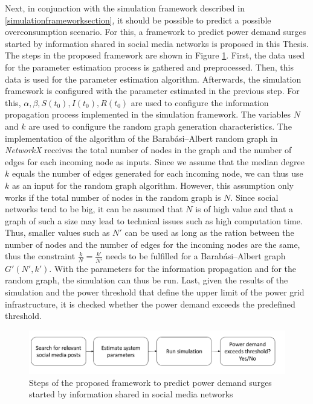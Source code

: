 Next, in conjunction with the simulation framework described in 
\ref{simulationframeworksection}, it should be possible to predict 
a possible overconsumption scenario. For this, a framework
to predict power demand surges started by information shared in 
social media networks is proposed in this Thesis. The steps
in the proposed framework are shown in Figure \ref{basicpredicitonframework}.
First, the data used for the parameter estimation process is gathered and
preprocessed. Then, this data is used for the parameter estimation algorithm. 
Afterwards, the simulation framework is configured
with the parameter estimated in the previous step. For this, 
$\alpha, \beta, S(t_0), I(t_0), R(t_0)$ are used to configure the 
information propagation process implemented in the simulation framework.
The variables $N$ and $k$ are used to configure the random graph generation
characteristics. The implementation of the 
algorithm of the Barabási–Albert random graph in \textit{NetworkX}
receives the total number of nodes in the graph and the number of edges 
for each incoming node as inputs. Since we assume that the median degree
$k$ equals the number of edges generated for each incoming node, we can thus
use $k$ as an input for the random graph algorithm. However, this assumption
only works if the total number of nodes in the random graph is $N$.
Since social networks tend to be big, it can be assumed that 
$N$ is of high value and that a graph of such a size may lead to technical 
issues such as high computation time. Thus, smaller values such as $N'$
can be used as long as the ration between the number of nodes and the
number of edges for the incoming nodes are the same, thus the constraint
$\frac{k}{N}=\frac{k'}{N'}$ needs to be fulfilled for a Barabási–Albert
graph $G'(N',k')$. With the parameters for the information propagation and 
for the random graph, the simulation can thus be run. 
Last, given the results of the simulation and the power threshold
that define the upper limit of the power grid infrastructure, it
is checked whether the power demand exceeds the predefined threshold.


\begin{figure}[!ht]
    \center
    \includegraphics[scale=.65]{figs/full_prediction_framework.png}
    \caption{Steps of the proposed framework to predict power demand surges
    started by information shared in social media networks}
    \label{basicpredicitonframework}
\end{figure}



